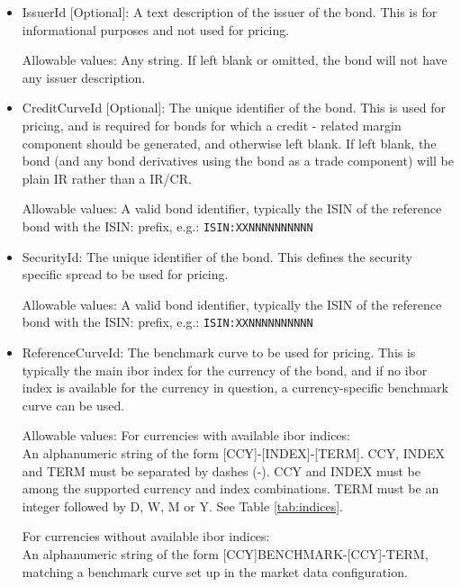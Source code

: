 \begin{itemize}
\item IssuerId [Optional]: A text description of the issuer of the bond.  This is for informational purposes and not used for pricing.

Allowable values: Any string. If left blank or omitted, the bond will not have any issuer description.

\item CreditCurveId [Optional]: The unique identifier of the bond. This is used for pricing, and is required for bonds for which a credit - related margin component should be generated, and otherwise left blank. If left blank, the bond (and any bond derivatives using the bond as a trade component) will be  plain IR rather than a IR/CR. 

Allowable values: A valid bond identifier, typically the ISIN of the reference bond with the ISIN: prefix, e.g.: \verb+ISIN:XXNNNNNNNNNN+

\item SecurityId: The unique identifier of the bond.  This defines the security specific spread to be used for pricing.

Allowable values: A valid bond identifier, typically the ISIN of the reference bond with the ISIN: prefix, e.g.: \verb+ISIN:XXNNNNNNNNNN+
  
\item ReferenceCurveId: The benchmark curve to be used for pricing. This is typically the main ibor index for the currency of the bond, and if no ibor index is available for the currency in question, a currency-specific benchmark curve can be used.

Allowable values: 
For currencies with available ibor indices: \\
An alphanumeric string of the form [CCY]-[INDEX]-[TERM]. CCY, INDEX and TERM must be separated by dashes (-). CCY and INDEX must be among the supported currency and index combinations. TERM must be an integer followed by D, W, M or Y. See Table \ref{tab:indices}. 

For currencies without available ibor indices:  \\
An alphanumeric string of the form [CCY]BENCHMARK-[CCY]-TERM, matching a benchmark curve set up in the market data configuration.


\end{itemize}
